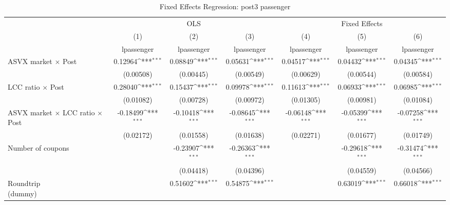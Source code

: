 \begin{table}[htbp]\centering
\def\sym#1{\ifmmode^{#1}\else\(^{#1}\)\fi}
\caption{Fixed Effects Regression: post3 passenger}
\begin{tabular}{l*{6}{c}}
\toprule
                    &\multicolumn{3}{c}{OLS}                                          &\multicolumn{3}{c}{Fixed Effects}                                \\\cmidrule(lr){2-4}\cmidrule(lr){5-7}
                    &\multicolumn{1}{c}{(1)}&\multicolumn{1}{c}{(2)}&\multicolumn{1}{c}{(3)}&\multicolumn{1}{c}{(4)}&\multicolumn{1}{c}{(5)}&\multicolumn{1}{c}{(6)}\\
                    &\multicolumn{1}{c}{lpassenger}&\multicolumn{1}{c}{lpassenger}&\multicolumn{1}{c}{lpassenger}&\multicolumn{1}{c}{lpassenger}&\multicolumn{1}{c}{lpassenger}&\multicolumn{1}{c}{lpassenger}\\
\midrule
ASVX market $\times$ Post&     0.12964\sym{***}&     0.08849\sym{***}&     0.05631\sym{***}&     0.04517\sym{***}&     0.04432\sym{***}&     0.04345\sym{***}\\
                    &   (0.00508)         &   (0.00445)         &   (0.00549)         &   (0.00629)         &   (0.00544)         &   (0.00584)         \\
\addlinespace
LCC ratio $\times$ Post&     0.28040\sym{***}&     0.15437\sym{***}&     0.09978\sym{***}&     0.11613\sym{***}&     0.06933\sym{***}&     0.06985\sym{***}\\
                    &   (0.01082)         &   (0.00728)         &   (0.00972)         &   (0.01305)         &   (0.00981)         &   (0.01084)         \\
\addlinespace
ASVX market $\times$ LCC ratio $\times$ Post&    -0.18499\sym{***}&    -0.10418\sym{***}&    -0.08645\sym{***}&    -0.06148\sym{***}&    -0.05399\sym{***}&    -0.07258\sym{***}\\
                    &   (0.02172)         &   (0.01558)         &   (0.01638)         &   (0.02271)         &   (0.01677)         &   (0.01749)         \\
\addlinespace
Number of coupons   &                     &    -0.23907\sym{***}&    -0.26363\sym{***}&                     &    -0.29618\sym{***}&    -0.31474\sym{***}\\
                    &                     &   (0.04418)         &   (0.04396)         &                     &   (0.04559)         &   (0.04566)         \\
\addlinespace
\shortstack{Roundtrip \\ (dummy)}&                     &     0.51602\sym{***}&     0.54875\sym{***}&                     &     0.63019\sym{***}&     0.66018\sym{***}\\

\end{tabular}
\end{table}
